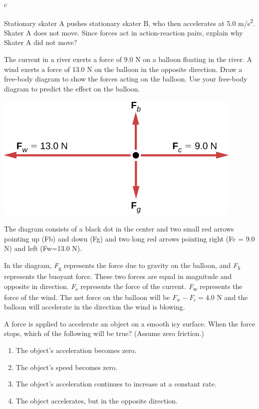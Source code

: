 \documentclass[
]{book}
\providecommand{\tightlist}{%
  \setlength{\itemsep}{0pt}\setlength{\parskip}{0pt}}
\newenvironment{ap-test-prep}{}{}
\begin{document}
\begin{ap-test-prep}
\leavevmode\hypertarget{fs-id1334244}{}%
\(c\)

\hypertarget{fs-id1683591}{}
\leavevmode\hypertarget{fs-id1271022}{}%
Stationary skater A pushes stationary skater B, who then accelerates at
5.0 m/s\textsuperscript{2}. Skater A does not move. Since forces act in action-reaction
pairs, explain why Skater A did not move?

\hypertarget{fs-id1870798}{}
\leavevmode\hypertarget{fs-id1455520}{}%
The current in a river exerts a force of 9.0 N on a balloon floating in
the river. A wind exerts a force of 13.0 N on the balloon in the
opposite direction. Draw a free-body diagram to show the forces acting
on the balloon. Use your free-body diagram to predict the effect on the
balloon.

\leavevmode\hypertarget{fs-id1468376}{}%
\includegraphics{images/Figure_04_04_03.jpg}

The diagram consists of a black dot in the center and two small red
arrows pointing up (Fb) and down (Fg) and two long red arrows pointing
right (Fc = 9.0 N) and left (Fw=13.0 N).

In the diagram, \emph{F}\textsubscript{g} represents the force due to gravity on the
balloon, and \emph{F\textsubscript{b}} represents the buoyant force. These two forces are
equal in magnitude and opposite in direction. \emph{F}\textsubscript{c} represents the
force of the current. \emph{F}\textsubscript{w} represents the force of the wind. The net
force on the balloon will be \(F_{w} - F_{c} = 4.0\) N and the balloon
will accelerate in the direction the wind is blowing.

\hypertarget{fs-id946101}{}
\leavevmode\hypertarget{fs-id1605382}{}%
A force is applied to accelerate an object on a smooth icy surface. When
the force stops, which of the following will be true? (Assume zero
friction.)

\begin{enumerate}
\def\labelenumi{\alph{enumi}.}
\tightlist
\item
  The object's acceleration becomes zero.
\item
  The object's speed becomes zero.
\item
  The object's acceleration continues to increase at a constant rate.
\item
  The object accelerates, but in the opposite direction.
\end{enumerate}


\end{ap-test-prep}
\end{document}
